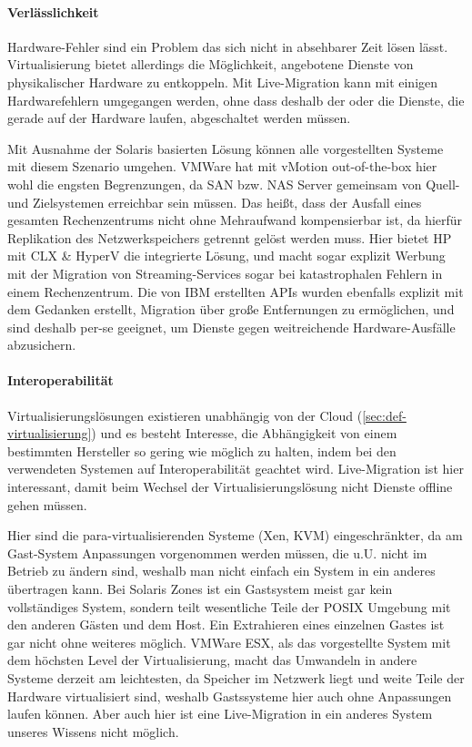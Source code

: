 \paragraph{Verlässlichkeit}
Hardware-Fehler sind ein Problem das sich nicht in absehbarer Zeit
lösen lässt. Virtualisierung bietet allerdings die Möglichkeit,
angebotene Dienste von physikalischer Hardware zu entkoppeln. Mit
Live-Migration kann mit einigen Hardwarefehlern umgegangen werden,
ohne dass deshalb der oder die Dienste, die gerade auf der Hardware
laufen, abgeschaltet werden müssen.

Mit Ausnahme der Solaris basierten Lösung können alle vorgestellten
Systeme mit diesem Szenario umgehen. VMWare hat mit vMotion
out-of-the-box hier wohl die engsten Begrenzungen, da \ac{SAN}
bzw. \ac{NAS} Server gemeinsam von Quell- und Zielsystemen erreichbar
sein müssen. Das heißt, dass der Ausfall eines gesamten Rechenzentrums
nicht ohne Mehraufwand kompensierbar ist, da hierfür Replikation des
Netzwerkspeichers getrennt gelöst werden muss. Hier bietet HP mit
\ac{CLX} \& HyperV die integrierte Lösung, und macht sogar explizit
Werbung mit der Migration von Streaming-Services sogar bei
katastrophalen Fehlern in einem Rechenzentrum. Die von IBM erstellten
APIs wurden ebenfalls explizit mit dem Gedanken erstellt, Migration
über große Entfernungen zu ermöglichen, und sind deshalb per-se
geeignet, um Dienste gegen weitreichende Hardware-Ausfälle
abzusichern.
\paragraph{Interoperabilität}
Virtualisierungslösungen existieren unabhängig von der Cloud
(\autoref{sec:def-virtualisierung}) und es besteht Interesse, die
Abhängigkeit von einem bestimmten Hersteller so gering wie möglich zu
halten, indem bei den verwendeten Systemen auf Interoperabilität
geachtet wird. Live-Migration ist hier interessant, damit beim Wechsel
der Virtualisierungslösung nicht Dienste offline gehen müssen.

Hier sind die para-virtualisierenden Systeme (Xen, \ac{KVM})
eingeschränkter, da am Gast-System Anpassungen vorgenommen werden
müssen, die u.U. nicht im Betrieb zu ändern sind, weshalb man nicht
einfach ein System in ein anderes übertragen kann. Bei Solaris Zones
ist ein Gastsystem meist gar kein vollständiges System, sondern teilt
wesentliche Teile der POSIX Umgebung mit den anderen Gästen und dem
Host. Ein Extrahieren eines einzelnen Gastes ist gar nicht ohne
weiteres möglich. VMWare ESX, als das vorgestellte System mit dem
höchsten Level der Virtualisierung, macht das Umwandeln in andere
Systeme derzeit am leichtesten, da Speicher im Netzwerk liegt und
weite Teile der Hardware virtualisiert sind, weshalb Gastssysteme hier
auch ohne Anpassungen laufen können. Aber auch hier ist eine
Live-Migration in ein anderes System unseres Wissens nicht möglich.


